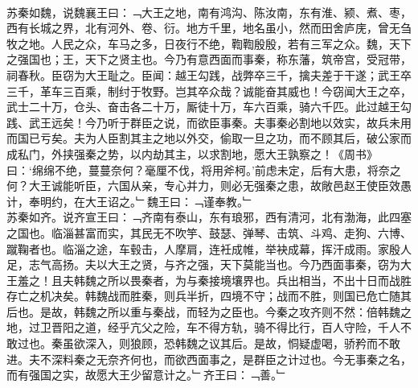 {\\
苏秦如魏，说魏襄王曰：﹁大王之地，南有鸿沟、陈汝南，东有淮、颍、煮、枣，西有长城之界，北有河外、卷、衍。地方千里，地名虽小，然而田舍庐庑，曾无刍牧之地。人民之众，车马之多，日夜行不绝，鞫鞫殷殷，若有三军之众。魏，天下之强国也；王，天下之贤主也。今乃有意西面而事秦，称东藩，筑帝宫，受冠带，祠春秋。臣窃为大王耻之。臣闻：越王勾践，战弊卒三千，擒夫差于干遂；武王卒三千，革车三百乘，制纣于牧野。岂其卒众哉？诚能奋其威也！今窃闻大王之卒，武士二十万，仓头、奋击各二十万，厮徒十万，车六百乘，骑六千匹。此过越王勾践、武王远矣！今乃听于群臣之说，而欲臣事秦。夫事秦必割地以效实，故兵未用而国已亏矣。夫为人臣割其主之地以外交，偷取一旦之功，而不顾其后，破公家而成私门，外挟强秦之势，以内劫其主，以求割地，愿大王孰察之！《周书》曰：‘绵绵不绝，蔓蔓奈何？毫厘不伐，将用斧柯。’前虑未定，后有大患，将奈之何？大王诚能听臣，六国从亲，专心并力，则必无强秦之患，故敞邑赵王使臣效愚计，奉明约，在大王诏之。﹂魏王曰：﹁谨奉教。﹂
\\
苏秦如齐。说齐宣王曰：﹁齐南有泰山，东有琅邪，西有清河，北有渤海，此四塞之国也。临淄甚富而实，其民无不吹竽、鼓瑟、弹琴、击筑、斗鸡、走狗、六博、蹴鞠者也。临淄之途，车毂击，人摩肩，连衽成帷，举袂成幕，挥汗成雨。家殷人足，志气高扬。夫以大王之贤，与齐之强，天下莫能当也。今乃西面事秦，窃为大王羞之！且夫韩魏之所以畏秦者，为与秦接境壤界也。兵出相当，不出十日而战胜存亡之机决矣。韩魏战而胜秦，则兵半折，四境不守；战而不胜，则国已危亡随其后也。是故，韩魏之所以重与秦战，而轻为之臣也。今秦之攻齐则不然：倍韩魏之地，过卫晋阳之道，经乎亢父之险，车不得方轨，骑不得比行，百人守险，千人不敢过也。秦虽欲深入，则狼顾，恐韩魏之议其后。是故，恫疑虚喝，骄矜而不敢进。夫不深料秦之无奈齐何也，而欲西面事之，是群臣之计过也。今无事秦之名，而有强国之实，故愿大王少留意计之。﹂齐王曰：﹁善。﹂
}
